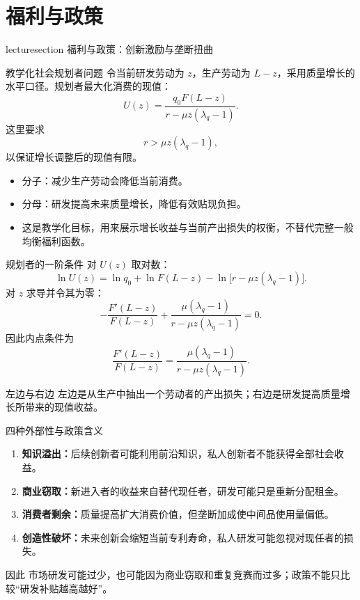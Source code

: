 \documentclass[aspectratio=32]{beamer}
\newcommand{\lecturesectionpage}[1]{%
\begin{frame}[plain]
\begin{center}
\vfill
\begin{beamercolorbox}[wd=0.74\textwidth,rounded=true,shadow=true,center,sep=1em]{lecturesection}
\LARGE #1
\end{beamercolorbox}
\vfill
\end{center}
\end{frame}
}
\begin{document}
\section{福利与政策}
\lecturesectionpage{福利与政策：创新激励与垄断扭曲}

\begin{frame}{教学化社会规划者问题}
\small
令当前研发劳动为 $z$，生产劳动为 $L-z$，采用质量增长的水平口径。规划者最大化消费的现值：
\[
  \boxed{U(z)=\frac{q_0F(L-z)}{r-\mu z(\lambda_q-1)}}.
\]
这里要求
\[
  r>\mu z(\lambda_q-1),
\]
以保证增长调整后的现值有限。
\begin{itemize}
  \item 分子：减少生产劳动会降低当前消费。
  \item 分母：研发提高未来质量增长，降低有效贴现负担。
  \item 这是教学化目标，用来展示增长收益与当前产出损失的权衡，不替代完整一般均衡福利函数。
\end{itemize}
\end{frame}

\begin{frame}{规划者的一阶条件}
\small
对 $U(z)$ 取对数：
\[
  \ln U(z)=\ln q_0+\ln F(L-z)-\ln\big[r-\mu z(\lambda_q-1)\big].
\]
对 $z$ 求导并令其为零：
\[
  -\frac{F'(L-z)}{F(L-z)}
  +\frac{\mu(\lambda_q-1)}{r-\mu z(\lambda_q-1)}=0.
\]
因此内点条件为
\[
  \boxed{\frac{F'(L-z)}{F(L-z)}
  =\frac{\mu(\lambda_q-1)}{r-\mu z(\lambda_q-1)}}.
\]
\begin{block}{左边与右边}
左边是从生产中抽出一个劳动者的产出损失；右边是研发提高质量增长所带来的现值收益。
\end{block}
\end{frame}

\begin{frame}{四种外部性与政策含义}
\small
\begin{enumerate}
  \item \textbf{知识溢出：}后续创新者可能利用前沿知识，私人创新者不能获得全部社会收益。
  \item \textbf{商业窃取：}新进入者的收益来自替代现任者，研发可能只是重新分配租金。
  \item \textbf{消费者剩余：}质量提高扩大消费价值，但垄断加成使中间品使用量偏低。
  \item \textbf{创造性破坏：}未来创新会缩短当前专利寿命，私人研发可能忽视对现任者的损失。
\end{enumerate}
\begin{alertblock}{因此}
市场研发可能过少，也可能因为商业窃取和重复竞赛而过多；政策不能只比较“研发补贴越高越好”。
\end{alertblock}
\end{frame}
\end{document}
